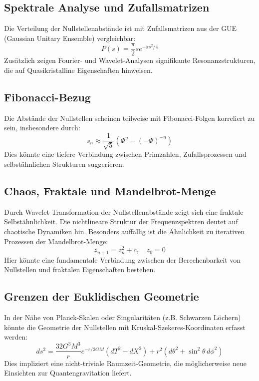 \documentclass[a4paper,12pt]{article}
\begin{document}
\subsection{Spektrale Analyse und Zufallsmatrizen}
Die Verteilung der Nullstellenabstände ist mit Zufallsmatrizen aus der GUE (Gaussian Unitary Ensemble) vergleichbar:
\begin{equation}
P(s) = \frac{\pi}{2} s e^{-\pi s^2 / 4}
\end{equation}
Zusätzlich zeigen Fourier- und Wavelet-Analysen signifikante Resonanzstrukturen, die auf Quasikristalline Eigenschaften hinweisen.

\subsection{Fibonacci-Bezug}
Die Abstände der Nullstellen scheinen teilweise mit Fibonacci-Folgen korreliert zu sein, insbesondere durch:
\begin{equation}
s_n \approx \frac{1}{\sqrt{5}} \left( \Phi^n - (-\Phi)^{-n} \right)
\end{equation}
Dies könnte eine tiefere Verbindung zwischen Primzahlen, Zufallsprozessen und selbstähnlichen Strukturen suggerieren.

\subsection{Chaos, Fraktale und Mandelbrot-Menge}
Durch Wavelet-Transformation der Nullstellenabstände zeigt sich eine fraktale Selbstähnlichkeit. Die nichtlineare Struktur der Frequenzspektren deutet auf chaotische Dynamiken hin. Besonders auffällig ist die Ähnlichkeit zu iterativen Prozessen der Mandelbrot-Menge:
\begin{equation}
z_{n+1} = z_n^2 + c, \quad z_0 = 0
\end{equation}
Hier könnte eine fundamentale Verbindung zwischen der Berechenbarkeit von Nullstellen und fraktalen Eigenschaften bestehen.

\subsection{Grenzen der Euklidischen Geometrie}
In der Nähe von Planck-Skalen oder Singularitäten (z.B. Schwarzen Löchern) könnte die Geometrie der Nullstellen mit Kruskal-Szekeres-Koordinaten erfasst werden:
\begin{equation}
ds^2 = \frac{32G^3M^3}{r} e^{-r/2GM} (dT^2 - dX^2) + r^2 (d\theta^2 + \sin^2 \theta \, d\phi^2)
\end{equation}
Dies impliziert eine nicht-triviale Raumzeit-Geometrie, die möglicherweise neue Einsichten zur Quantengravitation liefert.
\end{document}
